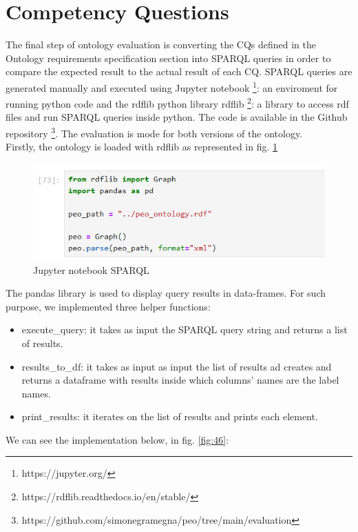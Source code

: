 \section{Competency Questions}
\label{section:5_4_cqs}
The final step of ontology evaluation is converting the CQs defined in the Ontology requirements specification section into SPARQL queries in order to compare the expected result to the actual result of each CQ.
SPARQL queries are generated manually and executed using Jupyter notebook \footnote{https://jupyter.org/}: an enviroment for running python code and the rdflib python library rdflib \footnote{https://rdflib.readthedocs.io/en/stable/}: a library to access rdf files and run SPARQL queries inside python.
The code is available in the  Github repository  \footnote{https://github.com/simonegramegna/peo/tree/main/evaluation}.
The evaluation is mode for both versions of the ontology.\\
Firstly, the ontology is loaded with rdflib as represented in fig. \ref{fig:45}
\begin{figure}[H]
    \centering
    \includegraphics[width=0.9\linewidth]{Figures/fig_45.png}
    \caption{Jupyter notebook SPARQL}
    \label{fig:45}
\end{figure}
The pandas library is used to display query results in data-frames.
For such purpose, we implemented three helper functions:
\begin{itemize}
    \item execute\_query: it takes as input the SPARQL query string and returns a list of results.

    \item results\_to\_df: it takes as input as input the list of results ad creates and returns a dataframe with results inside which columns' names are the label names.

    \item print\_results: it iterates on the list of results and prints each element.
\end{itemize}
We can see the implementation below, in fig. \ref{fig:46}:
